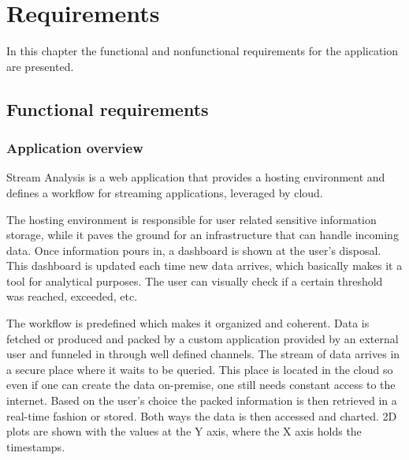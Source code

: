 \chapter{Requirements}
\label{chap:02}
In this chapter the functional and nonfunctional  requirements for the application are presented.

\section{Functional requirements}
\label{chap:02:02}

\subsection{Application overview}
\label{chap:02:02:01}
Stream Analysis is a web application that provides a hosting environment and defines a workflow for streaming applications, leveraged by cloud.

The hosting environment is responsible for user related sensitive information storage, while it paves the ground for an infrastructure that can handle incoming data. Once information pours in, a dashboard is shown at the user's disposal. This dashboard is updated each time new data arrives, which basically makes it a tool for analytical purposes. The user can visually check if a certain threshold was reached, exceeded, etc. 

The workflow is predefined which makes it organized and coherent. Data is fetched or produced and packed by a custom application provided by an external user and funneled in through well defined channels. The stream of data arrives in a secure place where it waits to be queried. This place is located in the cloud so even if one can create the data on-premise, one still needs constant access to the internet. Based on the user's choice the packed information is then retrieved in a real-time fashion or stored. Both ways the data is then accessed and charted. 2D plots are shown with the values at the Y axis, where the X axis holds the timestamps.

